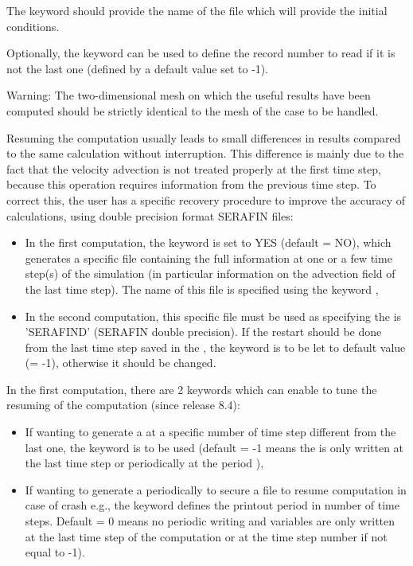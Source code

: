 The keyword  should provide the name of the
file which will provide the initial conditions.

Optionally, the keyword  can be used to
define the record number to read if it is not the last one (defined by a
default value set to -1).

\begin{WarningBlock}{Warning:}
The two-dimensional mesh on which the useful results have been computed should
be strictly identical to the mesh of the case to be handled.
\end{WarningBlock}

Resuming the computation usually leads to small differences in results
compared to the same calculation without interruption. This difference is
mainly due to the fact that the velocity advection is not treated properly at
the first time step, because this operation requires information from the
previous time step. To correct this, the user has a specific recovery procedure
to improve the accuracy of calculations, using double precision format SERAFIN
files:

\begin{itemize}
\item In the first computation, the keyword  is set to
YES (default = NO),
which generates a specific file containing the full information at one or a
few time step(s) of the simulation (in particular information on the
advection field of the last time step). The name of this file is specified
using the keyword ,

\item In the second computation, this specific file must be used as
 specifying the  is 'SERAFIND' (SERAFIN double precision).
If the restart should be done from the last time step saved in the
, the keyword  is to be
let to default value (= -1), otherwise it should be changed.
\end{itemize}

In the first computation, there are 2 keywords which can enable to tune the
resuming of the computation (since release 8.4):
\begin{itemize}
\item If wanting to generate a  at a specific number of
time step different from the last one, the keyword
 is to be used
(default = -1 means the  is only written at the last
time step or periodically at the period ),
\item If wanting to generate a  periodically to secure a
file to resume computation in case of crash e.g., the keyword
 defines the printout period in number of
time steps.
Default = 0 means no periodic writing and variables are only written at the last
time step of the computation or at the time step number
 if not equal to -1).
\end{itemize}

